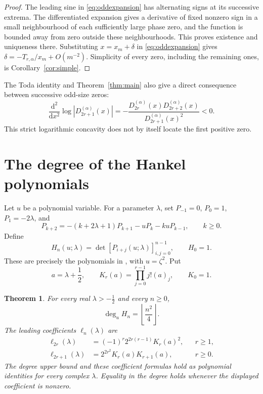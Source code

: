 \documentclass[11pt]{article}
\numberwithin{equation}{section}
\newtheorem{theorem}{Theorem}[section]
\theoremstyle{remark}
\begin{document}
\begin{proof}
The leading sine in \eqref{eq:oddexpansion} has alternating signs at its
successive extrema. The differentiated expansion gives a derivative
of fixed nonzero sign in a small neighbourhood of each sufficiently
large phase zero, and the function is bounded away from zero outside
these neighbourhoods. This proves existence and uniqueness there.
Substituting $x=x_m+\delta$ in \eqref{eq:oddexpansion} gives
$\delta=-T_{r,\alpha}/x_m+O(m^{-2})$. Simplicity of every zero,
including the remaining ones, is Corollary~\ref{cor:simple}.
\end{proof}

The Toda identity and Theorem~\ref{thm:main} also give a direct
consequence between successive odd-size zeros:
\begin{equation}\label{eq:logconcavity}
 \frac{\mathrm{d}^2}{\mathrm{d}x^2}
          \log|D_{2r+1}^{(\alpha)}(x)|
 =-\frac{D_{2r}^{(\alpha)}(x)D_{2r+2}^{(\alpha)}(x)}
          {D_{2r+1}^{(\alpha)}(x)^2}<0.
\end{equation}
This strict logarithmic concavity does not by itself locate the first
positive zero.

\section{The degree of the Hankel polynomials}\label{sec:degree}

Let $u$ be a polynomial variable. For a parameter $\lambda$, set
$P_{-1}=0$, $P_0=1$, $P_1=-2\lambda$, and
\begin{equation}\label{eq:Prec}
 P_{k+2}=-(k+2\lambda+1)P_{k+1}-uP_k-kuP_{k-1},\qquad k\ge0.
\end{equation}
Define
\begin{equation}\label{eq:Hdef}
 H_n(u;\lambda)=\det[P_{i+j}(u;\lambda)]_{i,j=0}^{n-1},\qquad H_0=1.
\end{equation}
These are precisely the polynomials in \cite[pp.~50--53]{MCM2008},
with $u=\zeta^2$. Put
\begin{equation}\label{eq:Kdef}
 a=\lambda+\frac12,\qquad
 K_r(a)=\prod_{j=0}^{r-1}j!(a)_j,\qquad K_0=1.
\end{equation}

\begin{theorem}\label{thm:Hdegree}
For every real $\lambda>-\tfrac12$ and every $n\ge0$,
\begin{equation}\label{eq:Hdegree}
                       \deg_u H_n=\left\lfloor\frac{n^2}{4}\right\rfloor.
\end{equation}
The leading coefficients $\ell_n(\lambda)$ are
\begin{align}
 \ell_{2r}(\lambda)&=(-1)^r2^{2r(r-1)}K_r(a)^2,
                    &&r\ge1,\label{eq:Hevenlead}\\
 \ell_{2r+1}(\lambda)&=2^{2r^2}K_r(a)K_{r+1}(a),
                    &&r\ge0.\label{eq:Hoddlead}
\end{align}
The degree upper bound and these coefficient formulas hold as
polynomial identities for every complex $\lambda$. Equality in the
degree holds whenever the displayed coefficient is nonzero.
\end{theorem}
\end{document}
